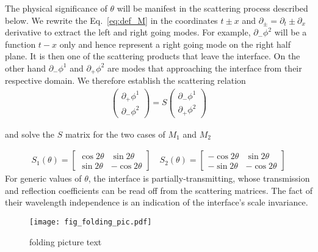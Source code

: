 The physical significance of $\theta$ will be manifest in the scattering process described below. We rewrite the Eq.~\eqref{eq:def_M} in the coordinates $t\pm x$ and $\partial_{\pm} = \partial_{t} \pm \partial_x $ derivative to extract the left and right going modes. For example, $\partial_{-} \phi^2$ will be a function $t - x$ only and hence represent a right going mode on the right half plane. It is then one of the scattering products that leave the interface. On the other hand $\partial_{-} \phi^1$ and $\partial_{+} \phi^2$ are modes that approaching the interface from their respective domain. We therefore establish the scattering relation 
\begin{equation}\begin{aligned}
\label{eq:def_S}
\begin{pmatrix}
\partial_+\phi^1\\
\partial_-\phi^2
\end{pmatrix}
=S
\begin{pmatrix}
\partial_-\phi^1\\
\partial_+\phi^2
\end{pmatrix}
\end{aligned}\end{equation}

and solve the $S$ matrix for the two cases of $M_1$ and $M_2$


\begin{equation}\begin{aligned}
\label{eq:S1_S2}
S_1(\theta)=\begin{bmatrix}
\cos 2\theta & \sin 2\theta \\
\sin 2\theta & -\cos 2\theta
\end{bmatrix}\quad
S_2(\theta)=\begin{bmatrix}
-\cos 2\theta & \sin 2\theta \\
-\sin 2\theta & -\cos 2\theta
\end{bmatrix}
\end{aligned}\end{equation}
For generic values of $\theta$, the interface is partially-transmitting, whose transmission and reflection coefficients can be read off from the scattering matrices. The fact of their wavelength independence is an indication of the interface's scale invariance. 

\begin{figure}[h]
\centering
\texttt{[image: fig\_folding\_pic.pdf]}
\caption{{\color{red} folding picture text}}
\label{fig:folding_pic}
\end{figure}

